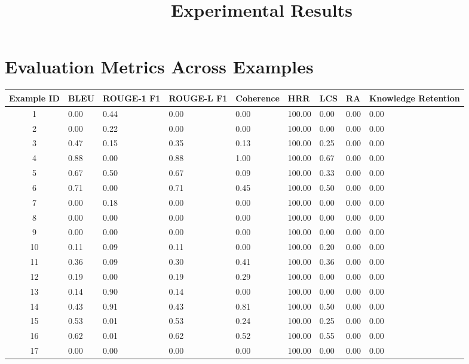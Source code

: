 \documentclass{article}
\title{Experimental Results}
\author{}
\date{}
\begin{document}
\maketitle
\section*{Evaluation Metrics Across Examples}
\begin{longtable}{|c|l|l|l|l|l|l|l|l|}
\hline
\textbf{Example ID} & \textbf{BLEU} & \textbf{ROUGE-1 F1} & \textbf{ROUGE-L F1} & \textbf{Coherence} & \textbf{HRR} & \textbf{LCS} & \textbf{RA} & \textbf{Knowledge Retention} \\ \hline
1 & 0.00 & 0.44 & 0.00 & 0.00 & 100.00 & 0.00 & 0.00 & 0.00 \\ \hline
2 & 0.00 & 0.22 & 0.00 & 0.00 & 100.00 & 0.00 & 0.00 & 0.00 \\ \hline
3 & 0.47 & 0.15 & 0.35 & 0.13 & 100.00 & 0.25 & 0.00 & 0.00 \\ \hline
4 & 0.88 & 0.00 & 0.88 & 1.00 & 100.00 & 0.67 & 0.00 & 0.00 \\ \hline
5 & 0.67 & 0.50 & 0.67 & 0.09 & 100.00 & 0.33 & 0.00 & 0.00 \\ \hline
6 & 0.71 & 0.00 & 0.71 & 0.45 & 100.00 & 0.50 & 0.00 & 0.00 \\ \hline
7 & 0.00 & 0.18 & 0.00 & 0.00 & 100.00 & 0.00 & 0.00 & 0.00 \\ \hline
8 & 0.00 & 0.00 & 0.00 & 0.00 & 100.00 & 0.00 & 0.00 & 0.00 \\ \hline
9 & 0.00 & 0.00 & 0.00 & 0.00 & 100.00 & 0.00 & 0.00 & 0.00 \\ \hline
10 & 0.11 & 0.09 & 0.11 & 0.00 & 100.00 & 0.20 & 0.00 & 0.00 \\ \hline
11 & 0.36 & 0.09 & 0.30 & 0.41 & 100.00 & 0.36 & 0.00 & 0.00 \\ \hline
12 & 0.19 & 0.00 & 0.19 & 0.29 & 100.00 & 0.00 & 0.00 & 0.00 \\ \hline
13 & 0.14 & 0.90 & 0.14 & 0.00 & 100.00 & 0.00 & 0.00 & 0.00 \\ \hline
14 & 0.43 & 0.91 & 0.43 & 0.81 & 100.00 & 0.50 & 0.00 & 0.00 \\ \hline
15 & 0.53 & 0.01 & 0.53 & 0.24 & 100.00 & 0.25 & 0.00 & 0.00 \\ \hline
16 & 0.62 & 0.01 & 0.62 & 0.52 & 100.00 & 0.55 & 0.00 & 0.00 \\ \hline
17 & 0.00 & 0.00 & 0.00 & 0.00 & 100.00 & 0.00 & 0.00 & 0.00 \\ \hline

\end{longtable}
\end{document}

